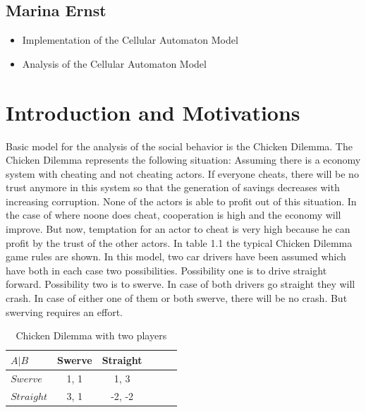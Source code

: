 \documentclass[11pt]{article}
\begin{document}
\subsection{Marina Ernst}
\begin{itemize}
\item Implementation of the Cellular Automaton Model
\item Analysis of the Cellular Automaton Model

\end{itemize}

\newpage












\section{Introduction and Motivations}

Basic model for the analysis of the social behavior is the Chicken Dilemma. The Chicken Dilemma represents the following situation:
Assuming there is a economy system with cheating and not cheating actors. If everyone cheats, there will be no trust anymore in this system so that the generation of savings decreases with increasing corruption. None of the actors is able to profit out of this situation. In the case of where noone does cheat, cooperation is high and the economy will improve. But now, temptation for an actor to cheat is very high because he can profit by the trust of the other actors.
\newline
In table 1.1 the typical Chicken Dilemma game rules are shown. In this model, two car drivers have been assumed which have both in each case two possibilities. Possibility one is to drive straight forward. Possibility two is to swerve. In case of both drivers go straight they will crash. In case of either one of them or both swerve, there will be no crash. But swerving requires an effort. 


\begin{table}[htbp]
\centering
\begin{tabular}{|l|c|c|l|c|c|}

\hline
$ A | B $     &     Swerve  &    Straight    \\                           
\hline
$ Swerve $      &  1,  1     &  1,  3  \\
\hline
$ Straight $      &  3,  1    &  -2,  -2       \\
\hline

                          
\end{tabular}

\label{table11} 
\caption{Chicken Dilemma with two players}

\end{table}
\end{document}
